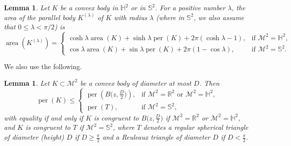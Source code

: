 \documentclass[12pt,reqno]{amsart}
\newtheorem{lemma}[theorem]{Lemma}
\theoremstyle{remark}
\newcommand{\R}{{\mathbb R}}
\newcommand{\hyp}{{\mathbb H}}
\newcommand{\sph}{{\mathbb S}}
\newcommand{\M}{\mathcal{M}}
\DeclareMathOperator{\per}{per}
\DeclareMathOperator{\area}{\mathrm{area}}
\begin{document}
\begin{lemma}\label{lem:steiner}
Let $K$ be a convex body in $\hyp^2$ or in $\sph^2$. For a positive number $\lambda$, the area of the parallel body $K^{(\lambda)}$ of $K$ with radius $\lambda$ (where in $\sph^2$, we also assume that $0\leq \lambda<\pi/2$) is
\begin{equation}
\area (K^{(\lambda)})=\begin{cases}
    \cosh\lambda \area (K)+\sinh\lambda \per (K)+2\pi(\cosh\lambda-1), &\text{if }\M^2=\hyp^2,\\
    \cos\lambda \area (K)+\sin\lambda \per (K)+2\pi(1-\cos\lambda), &\text{if }\M^2=\sph^2.
\end{cases}
\end{equation}
\end{lemma}

We also use the following.

\begin{lemma}\label{lem:maximal-perimeter}
Let $K\subset\M^2$ be a convex body of diameter at most $D$. Then
\begin{equation}
\per(K)\leq\begin{cases}
    \per \left (B\big(z,\frac{D}{2}\big)\right ), &\text{if }\M^2=\R^2 \text{ or }\M^2=\hyp^2,\\
    \per (T), &\text{if }\M^2=\sph^2,
\end{cases}
\end{equation}
with equality if and only if $K$ is congruent to $B\big(z,\frac{D}{2}\big)$ if $\M^2=\R^2$ or $\M^2=\hyp^2$, and $K$ is congruent to $T$ if $\M^2=\sph^2$, where $T$ denotes a regular spherical triangle of diameter (height) $D$ if $D\geq\frac{\pi}{2}$ and a Reuleaux triangle of diameter $D$ if $D<\frac{\pi}{2}$.
\end{lemma}
\end{document}

